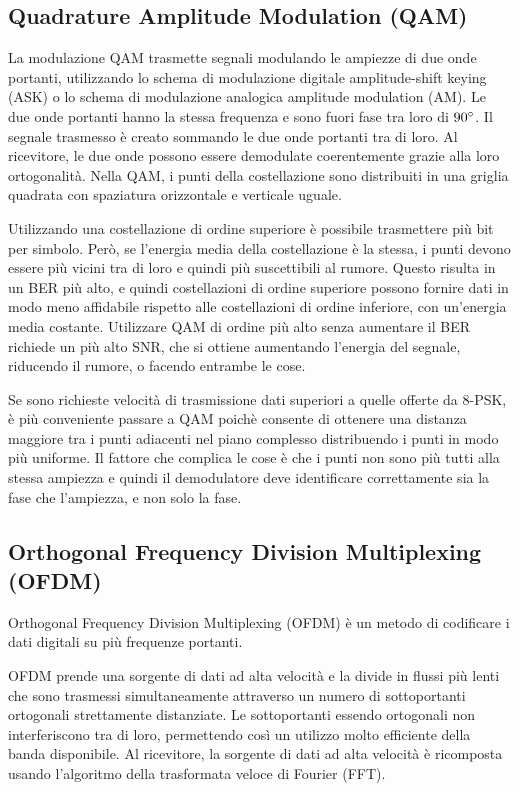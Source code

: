\subsection{Quadrature Amplitude Modulation (QAM)}
La modulazione \ac{QAM} trasmette segnali modulando le ampiezze di due onde portanti, utilizzando lo schema di modulazione digitale amplitude-shift keying (ASK) o lo schema di modulazione analogica amplitude modulation (AM). Le due onde portanti hanno la stessa frequenza e sono fuori fase tra loro di $90\degree$.
Il segnale trasmesso è creato sommando le due onde portanti tra di loro.
Al ricevitore, le due onde possono essere demodulate coerentemente grazie alla loro ortogonalità.
Nella \ac{QAM}, i punti della costellazione sono distribuiti in una griglia quadrata con spaziatura orizzontale e verticale uguale.

Utilizzando una costellazione di ordine superiore è possibile trasmettere più bit per simbolo.
Però, se l'energia media della costellazione è la stessa, i punti devono essere più vicini tra di loro e quindi più suscettibili al rumore.
Questo risulta in un \ac{BER} più alto, e quindi costellazioni di ordine superiore possono fornire dati in modo meno affidabile rispetto alle costellazioni di ordine inferiore, con un'energia media costante.
Utilizzare \ac{QAM} di ordine più alto senza aumentare il \ac{BER} richiede un più alto \ac{SNR}, che si ottiene aumentando l'energia del segnale, riducendo il rumore, o facendo entrambe le cose.

Se sono richieste velocità di trasmissione dati superiori a quelle offerte da 8-\ac{PSK}, è più conveniente passare a \ac{QAM} poichè consente di ottenere una distanza maggiore tra i punti adiacenti nel piano complesso distribuendo i punti in modo più uniforme.
Il fattore che complica le cose è che i punti non sono più tutti alla stessa ampiezza e quindi il demodulatore deve identificare correttamente sia la fase che l'ampiezza, e non solo la fase.

\subsection{Orthogonal Frequency Division Multiplexing (OFDM)}
Orthogonal Frequency Division Multiplexing (\ac{OFDM}) è un metodo di codificare i dati digitali su più frequenze portanti.

\ac{OFDM} prende una sorgente di dati ad alta velocità e la divide in flussi più lenti che sono trasmessi simultaneamente attraverso un numero di sottoportanti ortogonali strettamente distanziate.
Le sottoportanti essendo ortogonali non interferiscono tra di loro, permettendo così un utilizzo molto efficiente della banda disponibile.
Al ricevitore, la sorgente di dati ad alta velocità è ricomposta usando l'algoritmo della trasformata veloce di Fourier (FFT).

